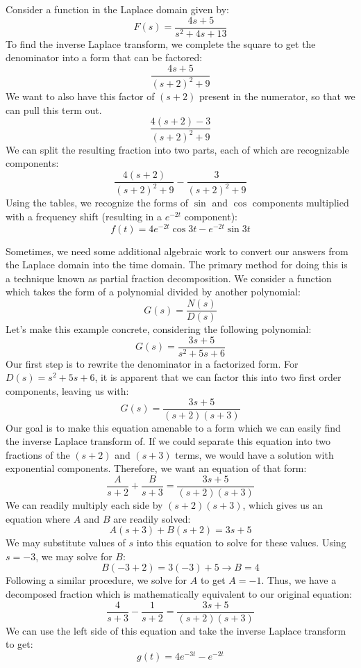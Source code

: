 \begin{example}
    Consider a function in the Laplace domain given by:
    $$F(s)=\frac{4s+5}{s^2+4s+13}$$
    To find the inverse Laplace transform, we complete the square to get the denominator into a form that can be factored:
    $$\frac{4s+5}{(s+2)^2+9}$$
We want to also have this factor of $(s+2)$ present in the numerator, so that we can pull this term out.
 $$\frac{4(s+2)-3}{(s+2)^2+9}$$
 We can split the resulting fraction into two parts, each of which are recognizable components:
  $$\frac{4(s+2)}{(s+2)^2+9}-\frac{3}{(s+2)^2+9}$$
  Using the tables, we recognize the forms of $\sin$ and $\cos$ components multiplied with a frequency shift (resulting in a $e^{-2t}$ component):
  $$f(t)=4e^{-2t}\cos3t-e^{-2t}\sin3t$$
\end{example}

\begin{example}
Sometimes, we need some additional algebraic work to convert our answers from the Laplace domain into the time domain. The primary method for doing this is a technique known as partial fraction decomposition. We consider a function which takes the form of a polynomial divided by another polynomial:
$$G(s)=\frac{N(s)}{D(s)}$$
Let's make this example concrete, considering the following polynomial:
$$G(s)=\frac{3s+5}{s^2+5s+6}$$
Our first step is to rewrite the denominator in a factorized form. For $D(s)=s^2+5s+6$, it is apparent that we can factor this into two first order components, leaving us with:
$$G(s)=\frac{3s+5}{(s+2)(s+3)}$$
Our goal is to make this equation amenable to a form which we can easily find the inverse Laplace transform of. If we could separate this equation into two fractions of the $(s+2)$ and $(s+3)$ terms, we would have a solution with exponential components. Therefore, we want an equation of that form:
$$\frac{A}{s+2}+\frac{B}{s+3}=\frac{3s+5}{(s+2)(s+3)}$$
We can readily multiply each side by $(s+2)(s+3)$, which gives us an equation where $A$ and $B$ are readily solved:
$$A(s+3)+B(s+2)=3s+5$$
We may substitute values of $s$ into this equation to solve for these values. Using $s=-3$, we may solve for $B$:
$$B(-3+2)=3(-3)+5\rightarrow B=4$$
Following a similar procedure, we solve for $A$ to get $A=-1$.
Thus, we have a decomposed fraction which is mathematically equivalent to our original equation:
$$\frac{4}{s+3}-\frac{1}{s+2}=\frac{3s+5}{(s+2)(s+3)}$$
We can use the left side of this equation and take the inverse Laplace transform to get:
$$g(t)=4e^{-3t}-e^{-2t}$$
\end{example}

